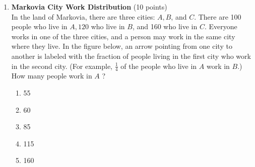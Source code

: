 \begin{enumerate}
  \item \textbf{Markovia City Work Distribution} (10 points)\\
  In the land of Markovia, there are three cities: $A, B$, and 
  $C$. There are 100 people who live in $A, 120$ who live in $B$, 
  and 160 who live in $C$. Everyone works in one of the three 
  cities, and a person may work in the same city where they live. 
  In the figure below, an arrow pointing from one city to another 
  is labeled with the fraction of people living in the first city 
  who work in the second city. (For example, $\frac{1}{4}$ of the 
  people who live in $A$ work in $B$.) How many people work in $A$ ?
  \begin{enumerate}[label=(\Alph*)]
    \item 55
    \item 60
    \item 85
    \item 115
    \item 160
  \end{enumerate}
  \begin{subanswer}
  \end{subanswer}
\end{enumerate}


